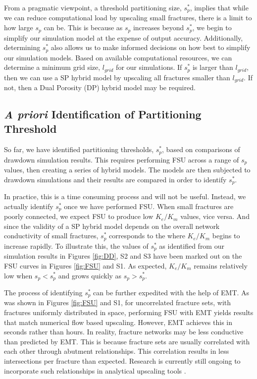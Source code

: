 \documentclass[draft]{agujournal2018}
\begin{document}
From a pragmatic viewpoint, a threshold partitioning size, $s_p^*$, implies that while we can reduce computational load by upscaling small fractures, there is a limit to how large $s_p$ can be. This is because as $s_p$ increases beyond $s_p^*$, we begin to simplify our simulation model at the expense of output accuracy. Additionally, determining $s_p^*$ also allows us to make informed decisions on how best to simplify our simulation models. Based on available computational resources, we can determine a minimum grid size, $l_{grid}$ for our simulations. If $s_p^*$ is larger than $l_{grid}$, then we can use a SP hybrid model by upscaling all fractures smaller than $l_{grid}$. If not, then a Dual Porosity (DP) hybrid model may be required.


\subsection{\textit{A priori} Identification of Partitioning Threshold}
So far, we have identified partitioning thresholds, $s_p^*$, based on comparisons of drawdown simulation results. This requires performing FSU across a range of $s_p$ values, then creating a series of hybrid models. The models are then subjected to drawdown simulations and their results are compared in order to identify $s_p^*$.

In practice, this is a time consuming process and will not be useful. Instead, we actually identify $s_p^*$ once we have performed FSU. When small fractures are poorly connected, we expect FSU to produce low $K_e/K_m$ values, vice versa. And since the validity of a SP hybrid model depends on the overall network conductivity of small fractures, $s_p^*$ corresponds to the where $K_e/K_m$ begins to increase rapidly. To illustrate this, the values of $s_p^*$ as identified from our simulation results in Figures \ref{fig:DD}, S2 and S3 have been marked out on the FSU curves in Figures \ref{fig:FSU} and S1. As expected, $K_e/K_m$ remains relatively low when $s_p<s_p^*$ and grows quickly as $s_p>s_p^*$. 

The process of identifying $s_p^*$ can be further expedited with the help of EMT. As was shown in Figures \ref{fig:FSU} and S1, for uncorrelated fracture sets, with fractures uniformly distributed in space, performing FSU with EMT yields results that match numerical flow based upscaling. However, EMT achieves this in seconds rather than hours. In reality, fracture networks may be less conductive than predicted by EMT. This is because fracture sets are usually correlated with each other through abutment relationships. This correlation results in less intersections per fracture than expected. Research is currently still ongoing to incorporate such relationships in analytical upscaling tools \citep{Hardebol2015, Makel2007, Saevik2017}. 
\end{document}
